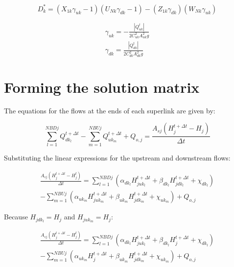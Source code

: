 \documentclass[11pt]{article}
\begin{document}
\begin{equation}
  D_k^* = (X_{1k} \gamma_{uk} - 1)(U_{Nk} \gamma_{dk} - 1) - (Z_{1k} \gamma_{dk})(W_{Nk} \gamma_{uk})
\end{equation}

\begin{align}
  \gamma_{uk} = -\frac{|Q_{uk}^{t}|}{2 C_{uk}^2 A_{uk}^2 g} \\
  \gamma_{dk} = \frac{|Q_{dk}^{t}|}{2 C_{dk}^2 A_{dk}^2 g}
\end{align}

\section*{Forming the solution matrix}

The equations for the flows at the ends of each superlink are given by:

\begin{equation}
  \sum_{l=1}^{NBDj} Q_{dk_l}^{t + \Delta t} - \sum_{m=1}^{NBUj} Q_{uk_m}^{t + \Delta t} + Q_{o,j} = \frac{A_{sj} (H_j^{t + \Delta t} - H_j)}{\Delta t}
\end{equation}

Substituting the linear expressions for the upstream and downstream flows:

\begin{equation}
  \begin{split}
    \frac{A_{sj} (H_j^{t + \Delta t} - H_j^t)}{\Delta t} =
    \sum_{l=1}^{NBDj} (\alpha_{dk_l} H_{juk_l}^{t + \Delta t} + \beta_{dk_l}
    H_{jdk_l}^{t + \Delta t} + \chi_{dk_l}) \\
    - \sum_{m=1}^{NBUj} (\alpha_{uk_m}
    H_{juk_m}^{t + \Delta t} + \beta_{uk_m} H_{jdk_m}^{t + \Delta t} + \chi_{uk_m}) +
    Q_{o,j}
  \end{split}
\end{equation}

Because $H_{jdk_l} = H_j$ and $H_{juk_m} = H_j$:

\begin{equation}
  \begin{split}
    \frac{A_{sj} (H_j^{t + \Delta t} - H_j^t)}{\Delta t} =
    \sum_{l=1}^{NBDj} (\alpha_{dk_l} H_{juk_l}^{t + \Delta t} + \beta_{dk_l}
    H_{j}^{t + \Delta t} + \chi_{dk_l})\\
    - \sum_{m=1}^{NBUj} (\alpha_{uk_m}
    H_{j}^{t + \Delta t} + \beta_{uk_m} H_{jdk_m}^{t + \Delta t} + \chi_{uk_m}) +
    Q_{o,j}
  \end{split}
\end{equation}
\end{document}

